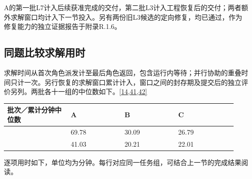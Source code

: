 A的第一批L7计入后续获准完成的交付，第二批L3计入工程恢复后的交付；两者额外求解窗口均计入下一节投入。另有两份旧L3候选的定向修复，均已通过，作为修复能力的独立证据报告于附录R.1.6。

\subsection[同题比较求解用时]{\texorpdfstring{\protect\hypertarget{section-3-2}{}同题比较求解用时}{同题比较求解用时}}
求解时间从首次角色派发计至最后角色返回，包含运行内等待；并行协助的重叠时间只计一次。另行恢复的求解窗口累计计入，窗口之间的封存期及提交后的独立评价另列。两批各十一组的中位数如下。\hyperlink{ref-14}{\mbox{[14,41,42]}}

\begingroup\small\setlength{\tabcolsep}{3pt}\renewcommand{\arraystretch}{1.14}
\par\nopagebreak\medskip\noindent\begin{minipage}[t]{\linewidth}
\begin{tabular}{>{\raggedright\arraybackslash}p{0.26\linewidth}>{\raggedright\arraybackslash}p{0.22\linewidth}>{\raggedright\arraybackslash}p{0.22\linewidth}>{\raggedright\arraybackslash}p{0.24\linewidth}}
\toprule
\textbf{批次／累计分钟中位数} & \textbf{A} & \textbf{B} & \textbf{C}\\\midrule

{1} & {69.78} & {30.09} & {26.79}\\
{2} & {41.03} & {20.21} & {22.01}\\
\bottomrule\end{tabular}\end{minipage}\par\medskip\endgroup
逐项用时如下，单位均为分钟。每行对应同一任务组，可结合上一节的完成结果阅读。

